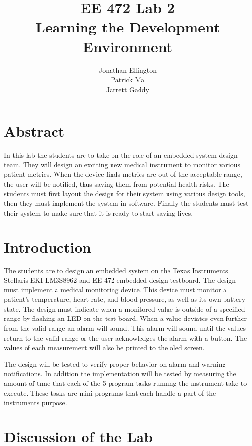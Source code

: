 \documentclass[12pt]{article} %
\title{\TitleFont EE 472 Lab 2 \\ Learning the Development Environment \vfill }
\author{\AuthorFont Jonathan Ellington \\ Patrick Ma \\ Jarrett Gaddy}
\date{}
\begin{document}
\maketitle
\thispagestyle{empty}
\pagebreak
\tableofcontents
\listoftables
\listoffigures
\thispagestyle{empty}
\pagebreak
\setcounter{page}{1}

\section{Abstract} In this lab the students are to take on the role of an
embedded system design team. They will design an exciting new medical
instrument to monitor various patient metrics. When the device finds metrics
are out of the acceptable range, the user will be notified, thus saving them
from potential health risks. The students must first layout the design for
their system using various design tools, then they must implement the system in
software. Finally the students must test their system to make sure that it is
ready to start saving lives.	

\section{Introduction}
The students are to design an embedded system on the Texas Instruments
Stellaris EKI-LM3S8962 and EE 472 embedded design testboard. The design must
implement a medical monitoring device. This device must monitor a patient's
temperature, heart rate, and blood pressure, as well as its own battery state.
The design must indicate when a monitored value is outside of a specified range
by flashing an LED on the test board. When a value deviates even further from
the valid range an alarm will sound. This alarm will sound until the values
return to the valid range or the user acknowledges the alarm with a button. The
values of each measurement will also be printed to the oled screen.

The design will be tested to verify proper behavior on alarm and warning notifications. In addition the implementation will be tested by measuring the amount of time that each of the 5 program tasks running the instrument take to execute. These tasks are mini programs that each handle a part of the instruments purpose.
 
\section{Discussion of the Lab}
\end{document}
